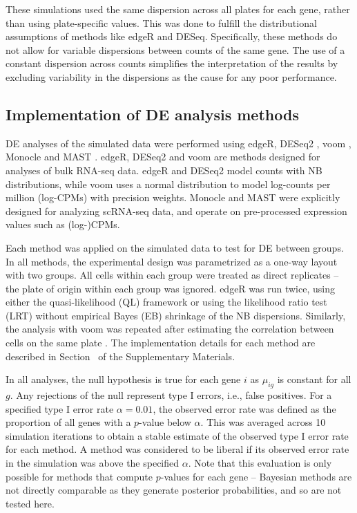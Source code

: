 \documentclass[oupdraft]{bio}
\begin{document}
These simulations used the same dispersion across all plates for each gene, rather than using plate-specific values.
This was done to fulfill the distributional assumptions of methods like edgeR and DESeq.
Specifically, these methods do not allow for variable dispersions between counts of the same gene.
The use of a constant dispersion across counts simplifies the interpretation of the results by excluding variability in the dispersions as the cause for any poor performance.

\subsection{Implementation of DE analysis methods}
DE analyses of the simulated data were performed using edgeR, DESeq2 \citep{love2014moderated}, voom \citep{law2014voom}, Monocle and MAST \citep{finak2015mast}.
edgeR, DESeq2 and voom are methods designed for analyses of bulk RNA-seq data.
edgeR and DESeq2 model counts with NB distributions, while voom uses a normal distribution to model log-counts per million (log-CPMs) with precision weights.
Monocle and MAST were explicitly designed for analyzing scRNA-seq data, and operate on pre-processed expression values such as (log-)CPMs.

Each method was applied on the simulated data to test for DE between groups. 
In all methods, the experimental design was parametrized as a one-way layout with two groups.
All cells within each group were treated as direct replicates -- the plate of origin within each group was ignored.
edgeR was run twice, using either the quasi-likelihood (QL) framework \citep{lund2012detecting} 
    or using the likelihood ratio test (LRT) \citep{mccarthy2012differential} without empirical Bayes (EB) shrinkage of the NB dispersions.
Similarly, the analysis with voom was repeated after estimating the correlation between cells on the same plate \citep{smyth2005use}.
The implementation details for each method are described in Section~\suppimplementation{} of the Supplementary Materials.

In all analyses, the null hypothesis is true for each gene $i$ as $\mu_{ig}$ is constant for all $g$.
Any rejections of the null represent type I errors, i.e., false positives.
For a specified type I error rate $\alpha = 0.01$, the observed error rate was defined as the proportion of all genes with a $p$-value below $\alpha$.
This was averaged across 10 simulation iterations to obtain a stable estimate of the observed type I error rate for each method. 
A method was considered to be liberal if its observed error rate in the simulation was above the specified $\alpha$.
Note that this evaluation is only possible for methods that compute $p$-values for each gene -- 
    Bayesian methods \citep{kharchenko2014bayesian} are not directly comparable as they generate posterior probabilities, and so are not tested here.
\end{document}
